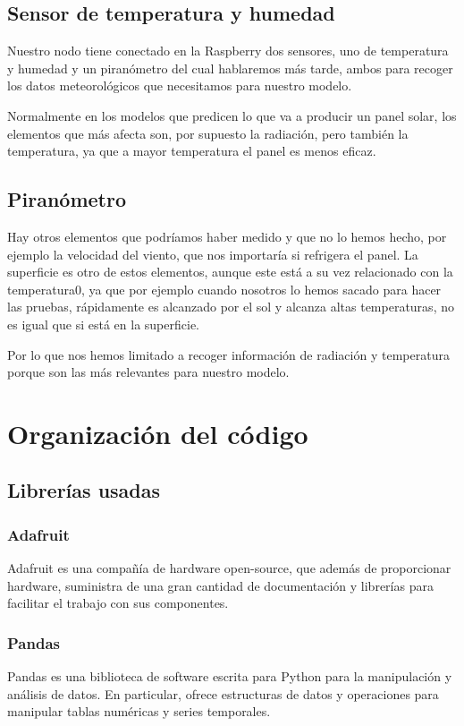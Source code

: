 \subsection{Sensor de temperatura y humedad}

Nuestro nodo tiene conectado en la Raspberry dos sensores, uno de temperatura y humedad y un piranómetro del cual hablaremos más tarde, ambos para recoger los datos meteorológicos que necesitamos para nuestro modelo.

Normalmente en los modelos que predicen lo que va a producir un panel solar, los elementos que más afecta son, por supuesto la radiación, pero también la temperatura, ya que a mayor temperatura el panel es menos eficaz. 


\subsection{Piranómetro}


Hay otros elementos que podríamos haber medido y que no lo hemos hecho, por ejemplo la velocidad del viento, que nos importaría si refrigera el panel.
La superficie es otro de estos elementos, aunque este está a su vez relacionado con la temperatura0, ya que por ejemplo cuando nosotros lo hemos sacado para hacer las pruebas, rápidamente es alcanzado por el sol y alcanza altas temperaturas, no es igual que si está en la superficie.

Por lo que nos hemos limitado a recoger información de radiación y temperatura porque son las más relevantes para nuestro modelo.
\section{Organización del código}
\label{makereference4.3} 
	\subsection{Librerías usadas}
		\subsubsection{Adafruit}
		Adafruit es una compañía de hardware open-source, que además de proporcionar hardware, suministra de una gran cantidad de documentación y librerías para facilitar el trabajo con sus componentes.
		
		\subsubsection{Pandas}
		Pandas es una biblioteca de software escrita para Python para la manipulación y análisis de datos. En particular, ofrece estructuras de datos y operaciones para manipular tablas numéricas y series temporales.
		
